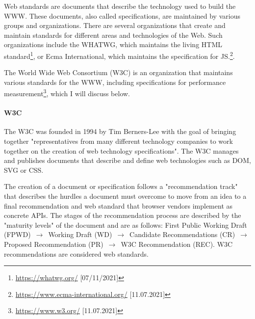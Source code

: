 Web standards are documents that describe the technology used to build the WWW. %
These documents, also called specifications, are maintained by various groups and organizations.
There are several organizations that create and maintain standards for different areas and technologies of the Web.
Such organizations include the WHATWG, which maintains the living HTML standard\footnote{\url{https://whatwg.org/} [07/11/2021]}, or Ecma International, which maintains the specification for JS.\footnote{\url{https://www.ecma-international.org/} [11.07.2021]}.

The World Wide Web Consortium (W3C) is an organization that maintains various standards for the WWW, including specifications for performance measurement\footnote{\url{https://www.w3.org/} [11.07.2021]}, which I will discuss below.


\paragraph{W3C} %


The W3C was founded in 1994 by Tim Berners-Lee with the goal of bringing together "representatives from many different technology companies to work together on the creation of web technology specifications". %
The W3C manages and publishes documents that describe and define web technologies such as DOM, SVG or CSS. %



The creation of a document or specification follows a "recommendation track" that describes the hurdles a document must overcome to move from an idea to a final recommendation and web standard that browser vendors implement as concrete APIs. %
The stages of the recommendation process are described by the "maturity levels" of the document and are as follows:
First Public Working Draft (FPWD) $\,\to\,$ Working Draft (WD) $\,\to\,$ Candidate Recommendations (CR) $\,\to\,$ Proposed Recommendation (PR) $\,\to\,$ W3C Recommendation (REC).  %
W3C recommendations are considered web standards. %

